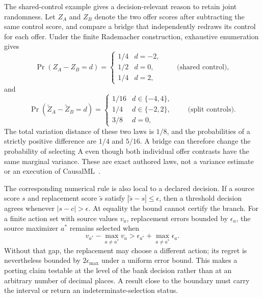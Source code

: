 The shared-control example gives a decision-relevant reason to retain joint
randomness. Let $Z_A$ and $Z_B$ denote the two offer scores after subtracting
the same control score, and compare a bridge that independently redraws its
control for each offer. Under the finite Rademacher construction, exhaustive
enumeration gives
\begin{equation}
 \Pr(Z_A-Z_B=d)=
 \begin{cases}1/4&d=-2,\\1/2&d=0,\\1/4&d=2,
 \end{cases}\qquad\text{(shared control)},
 \label{exec17:s9-law-shared}
\end{equation}
and
\begin{equation}
 \Pr(\widetilde Z_A-\widetilde Z_B=d)=
 \begin{cases}1/16&d\in\{-4,4\},\\1/4&d\in\{-2,2\},\\3/8&d=0,
 \end{cases}\qquad\text{(split controls)}.
 \label{exec17:s9-law-split}
\end{equation}
The total variation distance of these two laws is $1/8$, and the probabilities
of a strictly positive difference are $1/4$ and $5/16$. A bridge can therefore
change the probability of selecting A even though both individual offer
contrasts have the same marginal variance. These are exact authored laws,
not a variance estimate or an execution of CausalML~\citep{exec17_s9_law}.

The corresponding numerical rule is also local to a declared decision. If a
source score $s$ and replacement score $\widetilde s$ satisfy
$|\widetilde s-s|\leq\epsilon$, then a threshold decision agrees whenever
$|s-c|>\epsilon$. At equality the bound cannot certify the branch. For a
finite action set with source values $v_a$, replacement errors bounded by
$\epsilon_a$, the source maximizer $a^*$ remains selected when
\begin{equation}
 v_{a^*}-\max_{a\ne a^*}v_a
   >\epsilon_{a^*}+\max_{a\ne a^*}\epsilon_a.
 \label{exec17:s9-action-gap}
\end{equation}
Without that gap, the replacement may choose a different action; its regret
is nevertheless bounded by $2\epsilon_{\max}$ under a uniform error bound.
This makes a porting claim testable at the level of the bank decision rather
than at an arbitrary number of decimal places. A result close to the boundary
must carry the interval or return an indeterminate-selection status.

